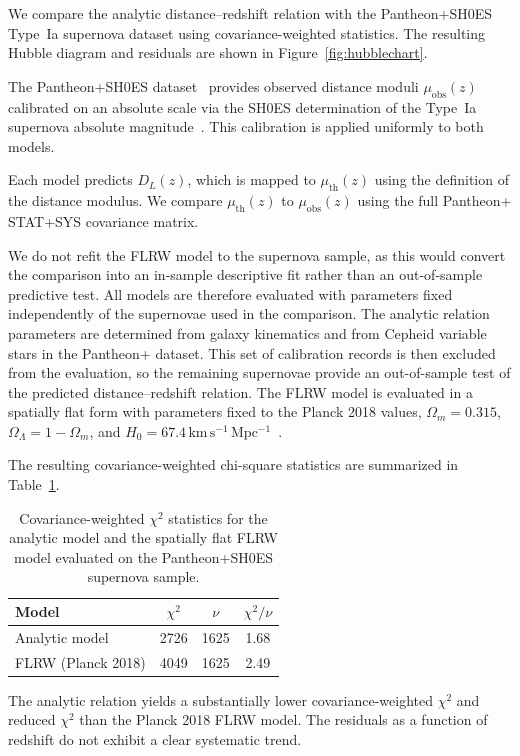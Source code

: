 \documentclass[fleqn,usenatbib]{mnras}
\begin{document}
We compare the analytic distance--redshift relation with the Pantheon+SH0ES Type~Ia supernova dataset using covariance-weighted statistics. The resulting Hubble diagram and residuals are shown in Figure~\ref{fig:hubblechart}.

The Pantheon+SH0ES dataset~\cite{Brout2022} provides observed distance moduli $\mu_{\mathrm{obs}}(z)$ calibrated on an absolute scale via the SH0ES determination of the Type~Ia supernova absolute magnitude~\cite{Riess2022}. This calibration is applied uniformly to both models.

Each model predicts $D_L(z)$, which is mapped to $\mu_{\mathrm{th}}(z)$ using the definition of the distance modulus. We compare $\mu_{\mathrm{th}}(z)$ to $\mu_{\mathrm{obs}}(z)$ using the full Pantheon+ STAT+SYS covariance matrix.

We do not refit the FLRW model to the supernova sample, as this would convert the comparison into an in-sample descriptive fit rather than an out-of-sample predictive test. All models are therefore evaluated with parameters fixed independently of the supernovae used in the comparison. The analytic relation parameters are determined from galaxy kinematics and from Cepheid variable stars in the Pantheon+ dataset. This set of calibration records is then excluded from the evaluation, so the remaining supernovae provide an out-of-sample test of the predicted distance--redshift relation. The FLRW model is evaluated in a spatially flat form with parameters fixed to the Planck 2018 values, $\Omega_m = 0.315$, $\Omega_\Lambda = 1-\Omega_m$, and $H_0 = 67.4\,\mathrm{km\,s^{-1}\,Mpc^{-1}}$~\cite{Planck2018}.

The resulting covariance-weighted chi-square statistics are summarized in Table~\ref{tab:chi2_comparison}.

\begin{table}
\centering
\begin{tabular}{lccc}
\hline
Model & $\chi^2$ & $\nu$ & $\chi^2/\nu$ \\
\hline
Analytic model & 2726 & 1625 & 1.68 \\
FLRW (Planck 2018) & 4049 & 1625 & 2.49 \\
\hline
\end{tabular}
\caption{Covariance-weighted $\chi^2$ statistics for the analytic model and the spatially flat FLRW model evaluated on the Pantheon+SH0ES supernova sample.}
\label{tab:chi2_comparison}
\end{table}

The analytic relation yields a substantially lower covariance-weighted $\chi^2$ and reduced $\chi^2$ than the Planck 2018 FLRW model. The residuals as a function of redshift do not exhibit a clear systematic trend.
\end{document}
